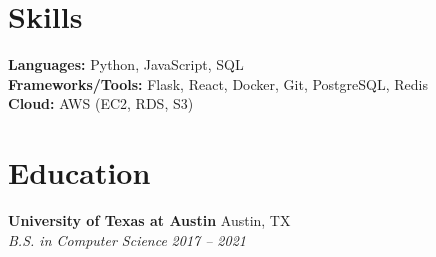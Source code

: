 \documentclass[11pt,letterpaper]{article}
\newcommand{\entry}[4]{\textbf{#1} \hfill #2\\ \textit{#3} \hfill \textit{#4}\par}
\begin{document}
\section{Skills}
\textbf{Languages:} Python, JavaScript, SQL \\
\textbf{Frameworks/Tools:} Flask, React, Docker, Git, PostgreSQL, Redis \\
\textbf{Cloud:} AWS (EC2, RDS, S3)

\section{Education}
\entry{University of Texas at Austin}{Austin, TX}{B.S. in Computer Science}{2017 -- 2021}
\end{document}

